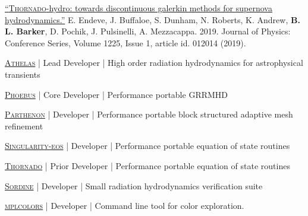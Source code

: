\documentclass[11pt]{vitae}
\begin{document}
\begin{publist}
\item \href{https://doi.org/10.1088/1742-6596/1225/1/012014}{``\textsc{Thornado}-hydro: towards discontinuous galerkin methods for supernova hydrodynamics.''} E. Endeve, J. Buffaloe, S. Dunham, N. Roberts, K. Andrew, \textbf{B. L. Barker}, D. Pochik, J. Pulsinelli, A. Mezzacappa. 2019. Journal of Physics: Conference Series, Volume 1225, Issue 1, article id. 012014 (2019).

\end{publist}

\begin{genericlist}
        \item \href{https://github.com/astrobarker/athelas}{\textsc{Athelas}} | Lead Developer | 
  High order radiation hydrodynamics for astrophysical transients
\item \href{https://github.com/lanl/phoebus}{\textsc{Phoebus}} | Core Developer | 
  Performance portable GRRMHD
\item \href{https://github.com/parthenon-hpc-lab/parthenon}{\textsc{Parthenon}} | Developer | 
  Performance portable block structured adaptive mesh refinement
\item \href{https://github.com/lanl/singularity-eos}{\textsc{Singularity-eos}} | Developer | 
  Performance portable equation of state routines
\item \href{https://github.com/endeve/thornado}{\textsc{Thornado}} | Prior Developer | 
  Performance portable equation of state routines
\item \href{https://github.com/astrobarker/sordine}{\textsc{Sordine}} | Developer | 
  Small radiation hydrodynamics verification suite
\item \href{https://github.com/astrobarker/mplcolors}{\textsc{mplcolors}} | Developer | 
  Command line tool for color exploration.
\end{genericlist}
\end{document}
